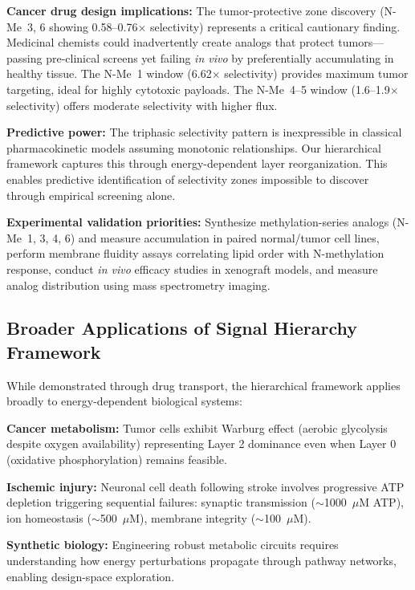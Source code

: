 \documentclass[10pt,letterpaper]{article}
\begin{document}
\textbf{Cancer drug design implications:} The tumor-protective zone discovery (N-Me~3, 6 showing 0.58--0.76$\times$ selectivity) represents a critical cautionary finding. Medicinal chemists could inadvertently create analogs that protect tumors---passing pre-clinical screens yet failing \textit{in vivo} by preferentially accumulating in healthy tissue. The N-Me~1 window (6.62$\times$ selectivity) provides maximum tumor targeting, ideal for highly cytotoxic payloads. The N-Me~4--5 window (1.6--1.9$\times$ selectivity) offers moderate selectivity with higher flux.

\textbf{Predictive power:} The triphasic selectivity pattern is inexpressible in classical pharmacokinetic models assuming monotonic relationships. Our hierarchical framework captures this through energy-dependent layer reorganization. This enables predictive identification of selectivity zones impossible to discover through empirical screening alone.

\textbf{Experimental validation priorities:} Synthesize methylation-series analogs (N-Me~1, 3, 4, 6) and measure accumulation in paired normal/tumor cell lines, perform membrane fluidity assays correlating lipid order with N-methylation response, conduct \textit{in vivo} efficacy studies in xenograft models, and measure analog distribution using mass spectrometry imaging.

\subsection{Broader Applications of Signal Hierarchy Framework}

While demonstrated through drug transport, the hierarchical framework applies broadly to energy-dependent biological systems:

\textbf{Cancer metabolism:} Tumor cells exhibit Warburg effect (aerobic glycolysis despite oxygen availability) representing Layer 2 dominance even when Layer 0 (oxidative phosphorylation) remains feasible.

\textbf{Ischemic injury:} Neuronal cell death following stroke involves progressive ATP depletion triggering sequential failures: synaptic transmission ($\sim$1000~$\mu$M ATP), ion homeostasis ($\sim$500~$\mu$M), membrane integrity ($\sim$100~$\mu$M).

\textbf{Synthetic biology:} Engineering robust metabolic circuits requires understanding how energy perturbations propagate through pathway networks, enabling design-space exploration.
\end{document}
